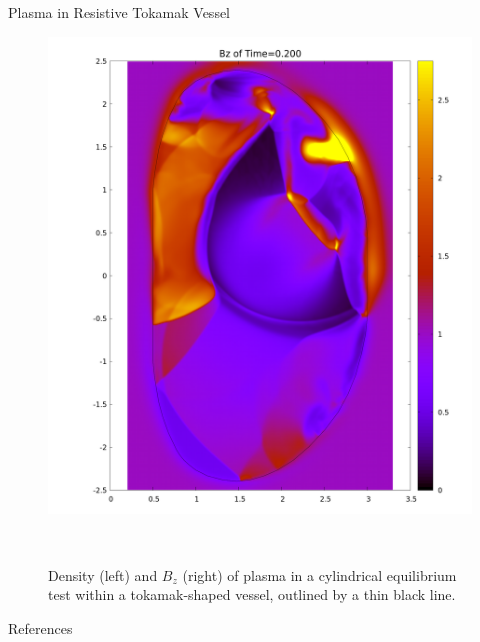 \documentclass[final]{beamer}
\begin{document}
\begin{frame}{}
\begin{textblock}{19.0}
\begin{block}{Plasma in Resistive Tokamak Vessel}
\begin{minipage}{0.93\linewidth}
\begin{figure}
\begin{minipage}{0.48\linewidth}
				\includegraphics[width = \linewidth]{Poster_Bz_100.png}
			\end{minipage}\\
			\begin{minipage}{1.0\linewidth}
				\caption{Density (left) and $B_z$ (right) of plasma in a cylindrical equilibrium test within a tokamak-shaped vessel, outlined by a thin black line.}
			\end{minipage}
			\vspace{-0.2cm}
		\end{figure}
	\end{minipage}
\end{block}
\vspace{-0.5cm}


\begin{block}{References}
\begin{minipage}{0.95\linewidth}
     {     \printbibliography   %
     } 
\end{minipage}
\end{block}

\end{textblock}

\end{frame}
\end{document}
